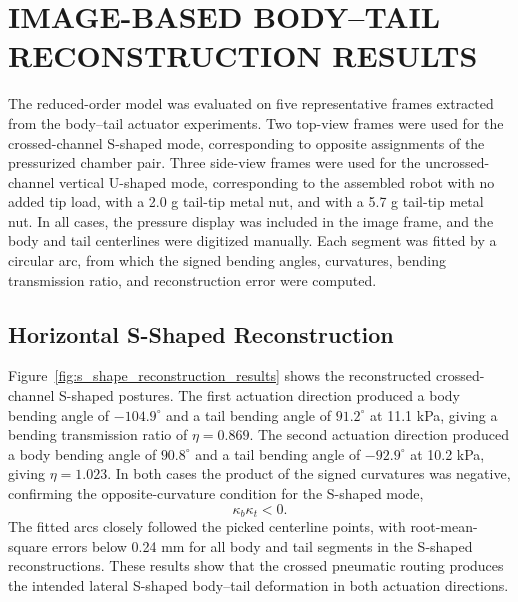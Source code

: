
%

\section{IMAGE-BASED BODY--TAIL RECONSTRUCTION RESULTS}
\label{sec:body_tail_reconstruction_results}

The reduced-order model was evaluated on five representative frames extracted from the body--tail actuator experiments. Two top-view frames were used for the crossed-channel S-shaped mode, corresponding to opposite assignments of the pressurized chamber pair. Three side-view frames were used for the uncrossed-channel vertical U-shaped mode, corresponding to the assembled robot with no added tip load, with a 2.0 g tail-tip metal nut, and with a 5.7 g tail-tip metal nut. In all cases, the pressure display was included in the image frame, and the body and tail centerlines were digitized manually. Each segment was fitted by a circular arc, from which the signed bending angles, curvatures, bending transmission ratio, and reconstruction error were computed.

\subsection{Horizontal S-Shaped Reconstruction}

Figure~\ref{fig:s_shape_reconstruction_results} shows the reconstructed crossed-channel S-shaped postures. The first actuation direction produced a body bending angle of $-104.9^\circ$ and a tail bending angle of $91.2^\circ$ at 11.1 kPa, giving a bending transmission ratio of $\eta=0.869$. The second actuation direction produced a body bending angle of $90.8^\circ$ and a tail bending angle of $-92.9^\circ$ at 10.2 kPa, giving $\eta=1.023$. In both cases the product of the signed curvatures was negative, confirming the opposite-curvature condition for the S-shaped mode,
\begin{equation}
  \kappa_b\kappa_t < 0 .
  \label{eqn:s_shape_result_condition}
\end{equation}
The fitted arcs closely followed the picked centerline points, with root-mean-square errors below 0.24 mm for all body and tail segments in the S-shaped reconstructions. These results show that the crossed pneumatic routing produces the intended lateral S-shaped body--tail deformation in both actuation directions.

